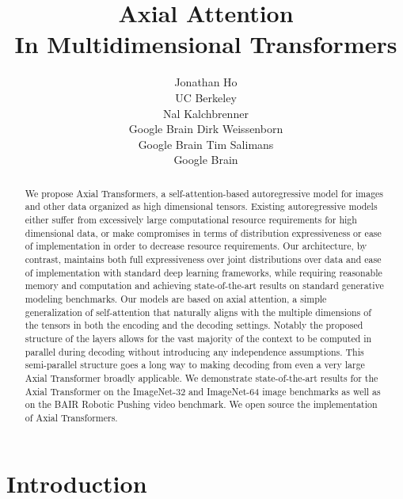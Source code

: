 \documentclass{article} \usepackage{iclr2020_conference,times}
\title{Axial Attention \\ In Multidimensional Transformers}
\author{Jonathan Ho \\ UC Berkeley\\  \And Nal Kalchbrenner \\ Google Brain \And Dirk Weissenborn \\ Google Brain \And Tim Salimans \\Google Brain}
\begin{document}
\maketitle

\begin{abstract}


We propose Axial Transformers, a self-attention-based autoregressive model for images and other data organized as high dimensional tensors. Existing autoregressive models either suffer from excessively large computational resource requirements for high dimensional data, or make compromises in terms of distribution expressiveness or ease of implementation in order to decrease resource requirements. Our architecture, by contrast, maintains both full expressiveness over joint distributions over data and ease of implementation with standard deep learning frameworks, while requiring reasonable memory and computation and achieving state-of-the-art results on standard generative modeling benchmarks. Our models are based on axial attention, a simple generalization of self-attention that naturally aligns with the multiple dimensions of the tensors in both the encoding and the decoding settings. Notably the proposed structure of the layers allows for the vast majority of the context to be computed in parallel during decoding without introducing any independence assumptions. This semi-parallel structure goes a long way to making decoding from even a very large Axial Transformer broadly applicable. We demonstrate state-of-the-art results for the Axial Transformer on the ImageNet-32 and ImageNet-64 image benchmarks as well as on the BAIR Robotic Pushing video benchmark. We open source the implementation of Axial Transformers.
\end{abstract}

\section{Introduction}
\end{document}

